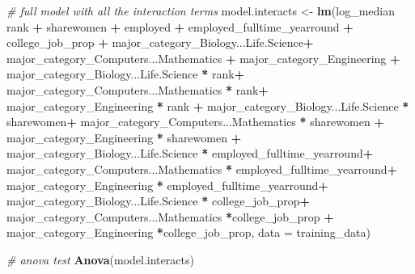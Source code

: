 \documentclass[
]{article}
\newenvironment{Shaded}{\begin{snugshade}}{\end{snugshade}}
\newcommand{\CommentTok}[1]{\textcolor[rgb]{0.56,0.35,0.01}{\textit{#1}}}
\newcommand{\DataTypeTok}[1]{\textcolor[rgb]{0.13,0.29,0.53}{#1}}
\newcommand{\KeywordTok}[1]{\textcolor[rgb]{0.13,0.29,0.53}{\textbf{#1}}}
\newcommand{\NormalTok}[1]{#1}
\newcommand{\OperatorTok}[1]{\textcolor[rgb]{0.81,0.36,0.00}{\textbf{#1}}}
\newcommand{\StringTok}[1]{\textcolor[rgb]{0.31,0.60,0.02}{#1}}
\begin{document}
\begin{Shaded}
\begin{Highlighting}[]
\CommentTok{# full model with all the interaction terms }
\NormalTok{model.interacts <-}\StringTok{ }\KeywordTok{lm}\NormalTok{(log_median }\OperatorTok{~}\StringTok{ }
\StringTok{                        }\NormalTok{rank }\OperatorTok{+}\StringTok{ }\NormalTok{sharewomen }\OperatorTok{+}\StringTok{ }
\StringTok{                        }\NormalTok{employed }\OperatorTok{+}\StringTok{ }\NormalTok{employed_fulltime_yearround }\OperatorTok{+}\StringTok{ }
\StringTok{                        }\NormalTok{college_job_prop }\OperatorTok{+}
\StringTok{                        }\NormalTok{major_category_Biology...Life.Science}\OperatorTok{+}
\StringTok{                        }\NormalTok{major_category_Computers...Mathematics }\OperatorTok{+}\StringTok{ }
\StringTok{                        }\NormalTok{major_category_Engineering }\OperatorTok{+}
\StringTok{                        }\NormalTok{major_category_Biology...Life.Science }\OperatorTok{*}\StringTok{ }\NormalTok{rank}\OperatorTok{+}
\StringTok{                        }\NormalTok{major_category_Computers...Mathematics }\OperatorTok{*}\StringTok{ }\NormalTok{rank}\OperatorTok{+}\StringTok{ }
\StringTok{                        }\NormalTok{major_category_Engineering }\OperatorTok{*}\StringTok{ }\NormalTok{rank }\OperatorTok{+}
\StringTok{                        }\NormalTok{major_category_Biology...Life.Science }\OperatorTok{*}\StringTok{ }\NormalTok{sharewomen}\OperatorTok{+}
\StringTok{                        }\NormalTok{major_category_Computers...Mathematics }\OperatorTok{*}\StringTok{ }\NormalTok{sharewomen }\OperatorTok{+}\StringTok{ }
\StringTok{                        }\NormalTok{major_category_Engineering }\OperatorTok{*}\StringTok{ }\NormalTok{sharewomen }\OperatorTok{+}
\StringTok{                        }\NormalTok{major_category_Biology...Life.Science }\OperatorTok{*}\StringTok{ }\NormalTok{employed_fulltime_yearround}\OperatorTok{+}
\StringTok{                        }\NormalTok{major_category_Computers...Mathematics }\OperatorTok{*}\StringTok{ }\NormalTok{employed_fulltime_yearround}\OperatorTok{+}\StringTok{ }
\StringTok{                        }\NormalTok{major_category_Engineering }\OperatorTok{*}\StringTok{ }\NormalTok{employed_fulltime_yearround}\OperatorTok{+}
\StringTok{                        }\NormalTok{major_category_Biology...Life.Science }\OperatorTok{*}\StringTok{ }\NormalTok{college_job_prop}\OperatorTok{+}
\StringTok{                        }\NormalTok{major_category_Computers...Mathematics }\OperatorTok{*}\NormalTok{college_job_prop }\OperatorTok{+}\StringTok{ }
\StringTok{                        }\NormalTok{major_category_Engineering }\OperatorTok{*}\NormalTok{college_job_prop, }
                        \DataTypeTok{data =}\NormalTok{ training_data)}


\CommentTok{# anova test}
\KeywordTok{Anova}\NormalTok{(model.interacts)}
\end{Highlighting}
\end{Shaded}
\end{document}
